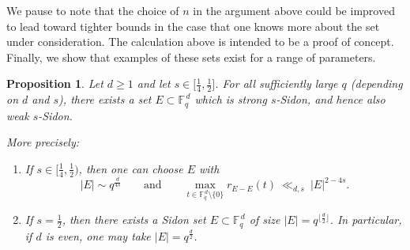 \documentclass{article}
\newtheorem{proposition}[theorem]{Proposition}
\begin{document}
We pause to note that the choice of $n$ in the argument above could be improved to lead toward tighter bounds in the case that one knows more about the set under consideration. The calculation above is intended to be a proof of concept. Finally, we show that examples of these sets exist for a range of parameters.

\begin{proposition}\label{prop:exist-s-sidon}
Let $d\ge 1$ and let $s\in \big[\frac{1}{4}, \frac{1}{2}\big]$.
For all sufficiently large $q$ (depending on $d$ and $s$), there exists a set
$E\subset \mathbb{F}_q^{\,d}$ which is strong $s$-Sidon, and hence also weak $s$-Sidon.

More precisely:

\begin{enumerate}
    \item[(i)] If $s\in \big[\frac{1}{4}, \frac{1}{2} \big)$, then one can choose $E$ with
        \[
        |E|\sim q^{\frac{d}{4s}}
        \qquad\text{and}\qquad
        \max_{t\in \mathbb{F}_q^{\,d}\setminus\{0\}} r_{E-E}(t)\ \ll_{d,s}\ |E|^{2-4s}.
        \]
    \item[(ii)]  If $s=\frac{1}{2}$, then there exists a Sidon set
$E\subset \mathbb{F}_q^{\,d}$ of size $|E|=q^{\lfloor \frac{d}{2} \rfloor}$.
In particular, if $d$ is even, one may take $|E|=q^{\frac{d}{2}}$.
\end{enumerate}
\end{proposition}
\end{document}
